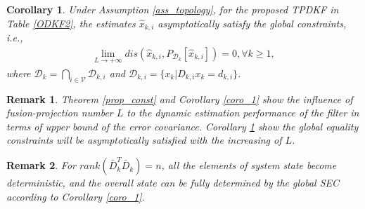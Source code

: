 \documentclass[journal,transmag]{IEEEtran}
\newtheorem{remark}{\textbf{Remark}}
\newtheorem{corollary}{\textbf{Corollary}}
\begin{document}
{\begin{corollary}\label{coro_2}
		Under Assumption \ref{ass_topology}, for the proposed TPDKF in Table \ref{ODKF2},	the estimates $\hat{x}_{k,i} $ asymptotically satisfy the global constraints, i.e., 
	\begin{align}\label{prop_eq_pro}
	\lim\limits_{L\rightarrow +\infty} dis(\hat x_{k,i},P_{\mathcal{D}_{k}}[\hat x_{k,i}])=0, \forall k\geq 1,
	\end{align}
	where $\mathcal{D}_{k}=\bigcap_{i\in\mathcal{V}} \mathcal{D}_{k,i}$ and $\mathcal{D}_{k,i}=\{x_k|D_{k,i}x_k=d_{k,i}\}$.
\end{corollary}


	

	\begin{remark}
		Theorem \ref{prop_const} and Corollary \ref{coro_1} show the influence of fusion-projection number $L$ to the dynamic estimation performance of the filter in terms of upper bound of the error covariance. Corollary \ref{coro_2} show the global equality constraints
		will be asymptotically satisfied with the increasing of $L$.		
	\end{remark}
	\begin{remark}
		For $rank(\bar D_{k}^T\bar D_{k})=n$, all the elements of system state become deterministic, and the overall state can	be fully determined by the global SEC according to Corollary \ref{coro_1}. 
	\end{remark}


	

}
\end{document}
